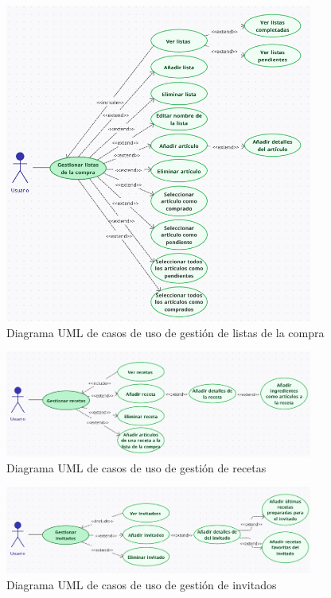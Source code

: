 \begin{figure}[H]
\centering
\includegraphics[width=0.9\textwidth]{./img/description/uml_listas.png}
\caption{Diagrama UML de casos de uso de gestión de listas de la compra}
\label{fig:uml_shopping}
\end{figure}

\begin{figure}[H]
\centering
\includegraphics[width=0.9\textwidth]{./img/description/uml_recetas.png}
\caption{Diagrama UML de casos de uso de gestión de recetas}
\label{fig:uml_recipe}
\end{figure}

\begin{figure}[H]
\centering
\includegraphics[width=0.9\textwidth]{./img/description/uml_invitados.png}
\caption{Diagrama UML de casos de uso de gestión de invitados}
\label{fig:uml_guest}
\end{figure}


